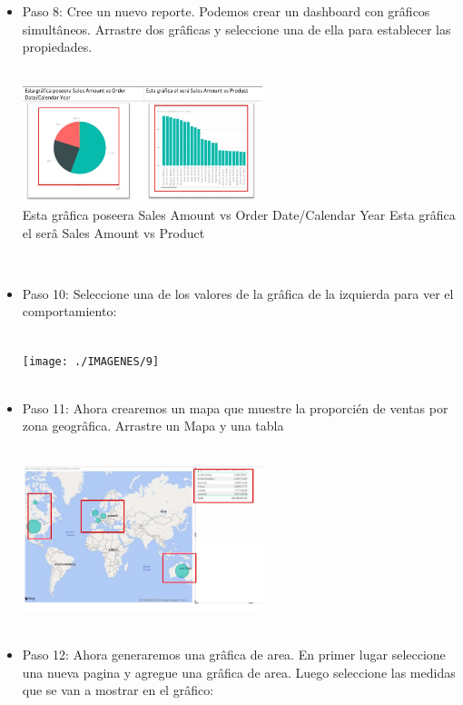 \documentclass[preprint,12pt]{elsarticle}
\begin{document}
\begin{itemize}
			
			\\ \item Paso 8: Cree un nuevo reporte.
			Podemos crear un dashboard con grâficos simultâneos. Arrastre dos grâficas y seleccione una de ella para establecer las propiedades.
			
				\\ \includegraphics[width=7cm]{./IMAGENES/8} \\
			
			
			Esta grâfica poseera Sales Amount vs Order
			Date/Calendar Year	Esta grâfica el serâ Sales Amount vs Product
			
			
			
			
		\\ \item	Paso 10: Seleccione una de los valores de la grâfica de la izquierda para ver el comportamiento:
			
				\\ \texttt{[image: ./IMAGENES/9]} \\
			
			
			
			\\ \item Paso 11: Ahora crearemos un mapa que muestre la proporcién de ventas por zona geogrâfica. Arrastre un Mapa y una tabla
			
			
				\\ \includegraphics[width=7cm]{./IMAGENES/11} \\
			
			
		\\ \item	Paso 12: Ahora generaremos una grâfica de area.
			En primer lugar seleccione una nueva pagina y agregue una grâfica de area. Luego seleccione las medidas que se van a mostrar en el grâfico:
			

\end{itemize}
\end{document}
